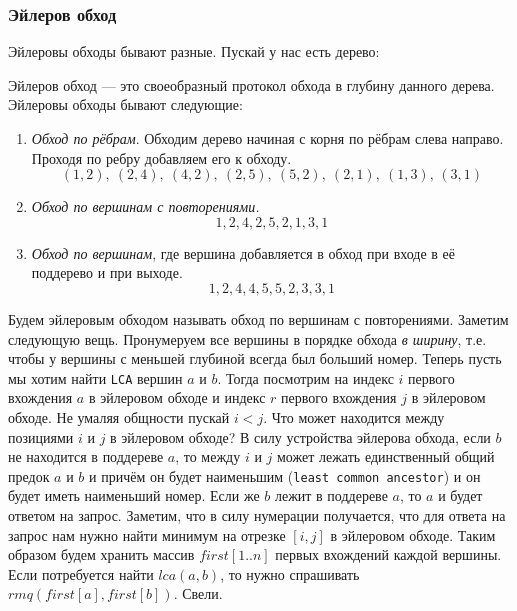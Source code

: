 \subsubsection{Эйлеров обход}
Эйлеровы обходы бывают разные. Пускай у нас есть дерево:
\begin{figure}[ht!]
\centering
{}
\end{figure}
Эйлеров обход --- это своеобразный протокол обхода в глубину данного дерева.
Эйлеровы обходы бывают следующие:
\begin{enumerate}
	\item \emph{Обход по рёбрам}. Обходим дерево начиная с корня по рёбрам слева направо. Проходя по ребру добавляем его к обходу.
	\[ (1,2),\ (2,4),\ (4,2),\ (2,5),\ (5,2),\ (2,1),\ (1,3),\, (3,1) \]
	\item \emph{Обход по вершинам с повторениями.}
	\[ 1, 2, 4, 2, 5, 2, 1, 3, 1 \]
	\item \emph{Обход по вершинам}, где вершина добавляется в обход при входе в её поддерево и при выходе.
	\[ 1, 2, 4, 4, 5, 5, 2, 3, 3, 1\]
\end{enumerate}
Будем эйлеровым обходом называть обход по вершинам с повторениями. Заметим следующую вещь. Пронумеруем все вершины в порядке обхода \emph{в ширину}, т.е. чтобы у вершины с меньшей глубиной всегда был больший номер. Теперь пусть мы хотим найти \texttt{LCA} вершин $a$ и $b$. Тогда посмотрим на индекс $i$ первого вхождения $a$ в эйлеровом обходе и индекс $r$ первого вхождения $j$ в эйлеровом обходе. Не умаляя общности пускай $i < j$. Что может находится между позициями $i$ и $j$ в эйлеровом обходе? В силу устройства эйлерова обхода, если $b$ не находится в поддереве $a$, то между $i$ и $j$ может лежать единственный общий предок $a$ и $b$ и причём он будет наименьшим (\texttt{least common ancestor}) и он будет иметь наименьший номер. Если же $b$ лежит в поддереве $a$, то $a$ и будет ответом на запрос. Заметим, что в силу нумерации получается, что для ответа на запрос нам нужно найти минимум на отрезке $[i, j]$ в эйлеровом обходе. Таким образом будем хранить массив $first[1..n]$ первых вхождений каждой вершины. Если потребуется найти $lca(a,b)$, то нужно спрашивать $rmq(first[a], first[b])$. Свели.
